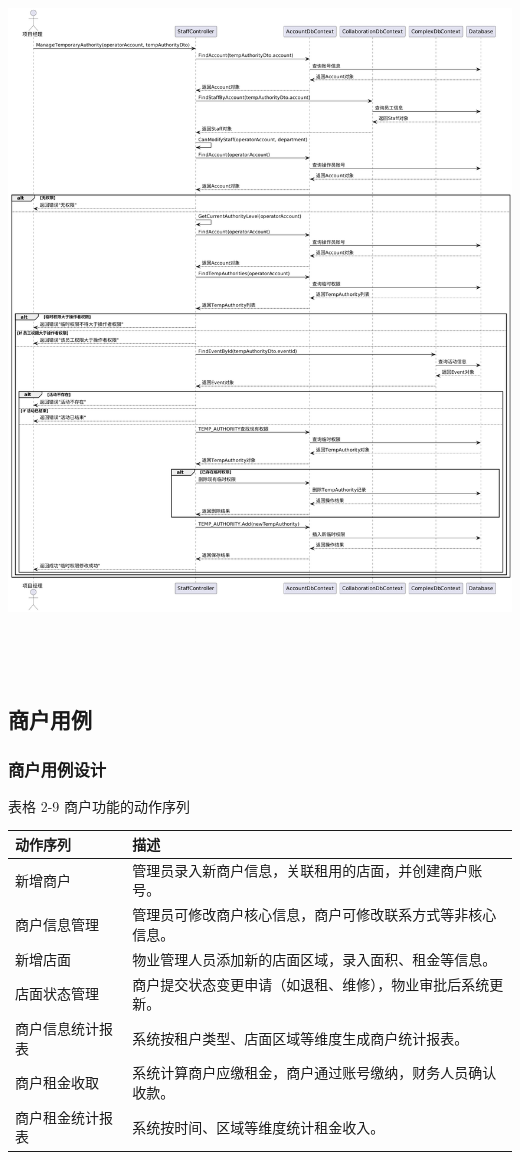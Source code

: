 \documentclass[]{article}
\let\oldincludegraphics\includegraphics
\renewcommand{\includegraphics}[2][]{%
  \begin{center}\oldincludegraphics[#1]{#2}\end{center}%
}
\begin{document}
\includegraphics[width=6.28194in,height=7.52361in]{media/media/image19.png}


\hypertarget{ux5546ux6237ux7528ux4f8b}{%
\subsection{商户用例}\label{ux5546ux6237ux7528ux4f8b}}

\hypertarget{ux5546ux6237ux7528ux4f8bux8bbeux8ba1}{%
\subsubsection{商户用例设计}\label{ux5546ux6237ux7528ux4f8bux8bbeux8ba1}}

表格 2-9 商户功能的动作序列
\begin{longtable}[]{@{}ll@{}}
\toprule
动作序列 & 描述\tabularnewline
\midrule
\endhead
新增商户 & 管理员录入新商户信息，关联租用的店面，并创建商户账号。\tabularnewline
商户信息管理 & 管理员可修改商户核心信息，商户可修改联系方式等非核心信息。\tabularnewline
新增店面 & 物业管理人员添加新的店面区域，录入面积、租金等信息。\tabularnewline
店面状态管理 & 商户提交状态变更申请（如退租、维修），物业审批后系统更新。\tabularnewline
商户信息统计报表 & 系统按租户类型、店面区域等维度生成商户统计报表。\tabularnewline
商户租金收取 & 系统计算商户应缴租金，商户通过账号缴纳，财务人员确认收款。\tabularnewline
商户租金统计报表 & 系统按时间、区域等维度统计租金收入。\tabularnewline
\bottomrule
\end{longtable}
\end{document}
